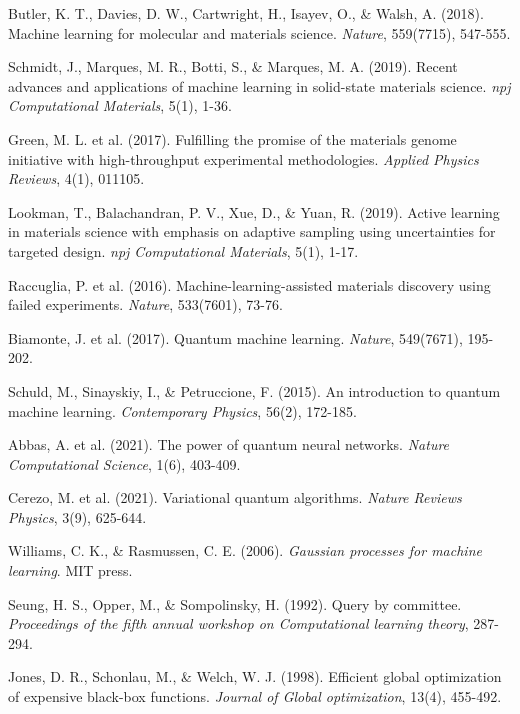 \documentclass{article}
\begin{document}

\begin{thebibliography}{20}

Butler, K. T., Davies, D. W., Cartwright, H., Isayev, O., \& Walsh, A. (2018). Machine learning for molecular and materials science. \textit{Nature}, 559(7715), 547-555.

Schmidt, J., Marques, M. R., Botti, S., \& Marques, M. A. (2019). Recent advances and applications of machine learning in solid-state materials science. \textit{npj Computational Materials}, 5(1), 1-36.

Green, M. L. et al. (2017). Fulfilling the promise of the materials genome initiative with high-throughput experimental methodologies. \textit{Applied Physics Reviews}, 4(1), 011105.

Lookman, T., Balachandran, P. V., Xue, D., \& Yuan, R. (2019). Active learning in materials science with emphasis on adaptive sampling using uncertainties for targeted design. \textit{npj Computational Materials}, 5(1), 1-17.

Raccuglia, P. et al. (2016). Machine-learning-assisted materials discovery using failed experiments. \textit{Nature}, 533(7601), 73-76.

Biamonte, J. et al. (2017). Quantum machine learning. \textit{Nature}, 549(7671), 195-202.

Schuld, M., Sinayskiy, I., \& Petruccione, F. (2015). An introduction to quantum machine learning. \textit{Contemporary Physics}, 56(2), 172-185.

Abbas, A. et al. (2021). The power of quantum neural networks. \textit{Nature Computational Science}, 1(6), 403-409.

Cerezo, M. et al. (2021). Variational quantum algorithms. \textit{Nature Reviews Physics}, 3(9), 625-644.

Williams, C. K., \& Rasmussen, C. E. (2006). \textit{Gaussian processes for machine learning}. MIT press.

Seung, H. S., Opper, M., \& Sompolinsky, H. (1992). Query by committee. \textit{Proceedings of the fifth annual workshop on Computational learning theory}, 287-294.

Jones, D. R., Schonlau, M., \& Welch, W. J. (1998). Efficient global optimization of expensive black-box functions. \textit{Journal of Global optimization}, 13(4), 455-492.


\end{thebibliography}
\end{document}
